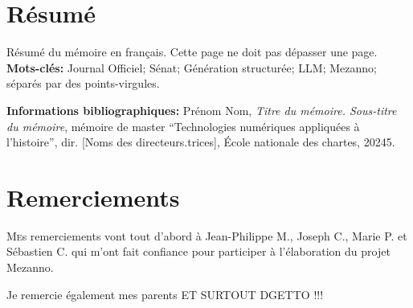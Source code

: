 \documentclass[12pt,twoside]{book}
\begin{document}
\frontmatter

	\chapter{Résumé}
\medskip
	Résumé du mémoire en français. Cette page ne doit pas dépasser une page.\\
	
	\textbf{Mots-clés:} Journal Officiel; Sénat; Génération structurée; LLM; Mezanno; séparés par des points-virgules.
	
	\textbf{Informations bibliographiques:} Prénom Nom, \textit{Titre du mémoire. Sous-titre du mémoire}, mémoire de master \enquote{Technologies numériques appliquées à l'histoire}, dir. [Noms des directeurs.trices], École nationale des chartes, 20245.
	
		\newpage{\pagestyle{empty}\cleardoublepage}
	
	\chapter{Remerciements}
	
\lettrine{M}es remerciements vont tout d'abord à Jean-Philippe M., Joseph C., Marie P. et Sébastien C. qui m'ont fait confiance pour participer à l'élaboration du projet Mezanno. 

Je remercie également mes parents ET SURTOUT DGETTO !!!
	\newpage{\pagestyle{empty}\cleardoublepage}
	


\printbibheading[heading=bibintoc]
\printbibliography[heading=subbibintoc,keyword=primaire,title=Sources primaires]
\printbibliography[heading=subbibintoc,keyword=archivistique,title=Méthodologie historique]
\printbibliography[heading=subbibintoc,keyword=parlementaire,title=Droit et histoire parlementaires]
\printbibliography[heading=subbibintoc,keyword=pat,title=Institutions  et politiques patrimoniales]
\printbibliography[heading=subbibintoc,keyword=hn,title=Humanités numériques]
\printbibliography[heading=subbibintoc,keyword=Numérisation,title=Images et numérisation]
\printbibliography[heading=subbibintoc,keyword=tal,title=Traitement automatique du langage]
\printbibliography[heading=subbibintoc,keyword=archeologie,title=Philosophie de la technique et médialité]
\printbibliography[heading=subbibintoc,keyword=maths,title=Mathématiques]

\end{document}
